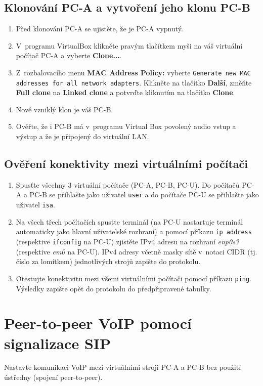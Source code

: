 \subsection{Klonování PC-A a vytvoření jeho klonu PC-B}
\begin{enumerate}
	\item Před klonování PC-A se ujistěte, že je PC-A vypnutý.
	\item V~programu VirtualBox klikněte pravým tlačítkem myši na váš virtuální počítač PC-A a vyberte \textbf{Clone...}.
	\item Z~rozbalovacího menu \textbf{MAC Address Policy:} vyberte \texttt{Generate new MAC addresses for all network adapters}. Klikněte na tlačítko \textbf{Další}, změňte \textbf{Full clone} na \textbf{Linked clone} a potvrďte kliknutím na tlačítko \textbf{Clone}.
	\item Nově vzniklý klon je váš PC-B.
	\item Ověřte, že i PC-B má v~programu Virtual Box povolený audio vstup a výstup a že je připojený do virtuální LAN.
\end{enumerate}


\subsection{Ověření konektivity mezi virtuálními počítači}
\begin{enumerate}
	\item Spusťte všechny 3 virtuální počítače (PC-A, PC-B, PC-U). Do počítačů PC-A a PC-B se přihlašte jako uživatel \texttt{user} a do počítače PC-U se přihlašte jako uživatel \texttt{isa}.
	\item Na všech třech počítačích spusťte terminál (na PC-U nastartuje terminál automaticky jako hlavní uživatelské rozhraní) a pomocí příkazu \verb{ip address{ (respektive \verb{ifconfig{ na PC-U) zjistěte IPv4 adresu na rozhraní \emph{enp0s3} (respektive \emph{em0} na PC-U). IPv4 adresy včetně masky sítě v~notaci CIDR (tj. číslo za lomítkem) jednotlivých strojů zapište do protokolu.
	\item Otestujte konektivitu mezi všemi virtuálními počítači pomocí příkazu \verb{ping{. Výsledky zapište opět do protokolu do předpřipravené tabulky.
\end{enumerate}


\section{Peer-to-peer VoIP pomocí signalizace SIP}
Nastavte komunikaci VoIP mezi virtuálními stroji PC-A a PC-B bez použití ústředny (spojení peer-to-peer).


